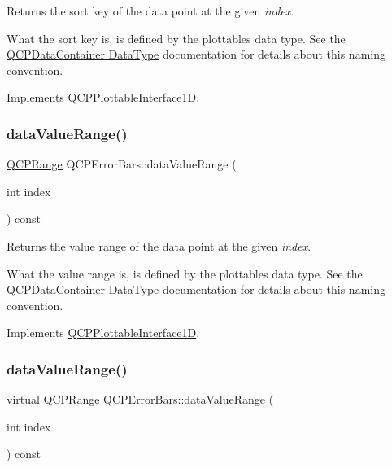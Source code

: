 Returns the sort key of the data point at the given {\itshape index}.

What the sort key is, is defined by the plottable\textquotesingle{}s data type. See the \hyperlink{class_q_c_p_data_container_qcpdatacontainer-datatype}{Q\+C\+P\+Data\+Container Data\+Type} documentation for details about this naming convention. 

Implements \hyperlink{class_q_c_p_plottable_interface1_d_afdc92f9f01e7e35f2e96b2ea9dc14ae7}{Q\+C\+P\+Plottable\+Interface1D}.

\mbox{\label{class_q_c_p_error_bars_a09b99cf293b6041ae8d5c52cf8dd599c}} 
\subsubsection{\texorpdfstring{data\+Value\+Range()}{dataValueRange()}\hspace{0.1cm}{\footnotesize\ttfamily [1/2]}}
{\footnotesize\ttfamily \hyperlink{class_q_c_p_range}{Q\+C\+P\+Range} Q\+C\+P\+Error\+Bars\+::data\+Value\+Range (\begin{DoxyParamCaption}\item[{int}]{index }\end{DoxyParamCaption}) const\hspace{0.3cm}{\ttfamily [virtual]}}

Returns the value range of the data point at the given {\itshape index}.

What the value range is, is defined by the plottable\textquotesingle{}s data type. See the \hyperlink{class_q_c_p_data_container_qcpdatacontainer-datatype}{Q\+C\+P\+Data\+Container Data\+Type} documentation for details about this naming convention. 

Implements \hyperlink{class_q_c_p_plottable_interface1_d_a9ca7fcf14d885a200879768679b19be9}{Q\+C\+P\+Plottable\+Interface1D}.

\mbox{\label{class_q_c_p_error_bars_af3a66650bc2a36b06a7d77f879b7eb8c}} 
\subsubsection{\texorpdfstring{data\+Value\+Range()}{dataValueRange()}\hspace{0.1cm}{\footnotesize\ttfamily [2/2]}}
{\footnotesize\ttfamily virtual \hyperlink{class_q_c_p_range}{Q\+C\+P\+Range} Q\+C\+P\+Error\+Bars\+::data\+Value\+Range (\begin{DoxyParamCaption}\item[{int}]{index }\end{DoxyParamCaption}) const\hspace{0.3cm}{\ttfamily [virtual]}}

